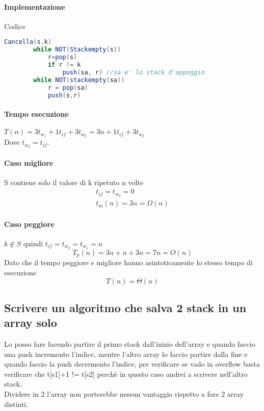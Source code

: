 \paragraph*{Implementazione} Codice
\begin{lstlisting}[language=Java]
    Cancella(s,k)
        while NOT(Stackempty(s))
            r=pop(s)
            if r != k
                push(sa, r) //sa e' lo stack d'appoggio
        while NOT(stackempty(sa))
            r = pop(sa)
            push(s,r)
\end{lstlisting}
\paragraph*{Tempo esecuzione} $T(n)=3t_{w_1}+1t_{if}+3t_{w_2} = 3n + 1t_{if}+3t_{w_2}$\\
Dove $t_{w_2}=t_{if}$.
\paragraph*{Caso migliore} S contiene solo il valore di k ripetuto n volte
\begin{align*}
    t_{if} = t_{w_2} = 0\\
    t_m(n)=3n = \Omega(n)
\end{align*}
\paragraph*{Caso peggiore} $k \notin S$ quindi $t_{if} = t_{w_2} = t_{w_1} = n$\\
\begin{equation*}
    T_p(n)=3n+n+3n=7n=O(n)
\end{equation*}
Dato che il tempo peggiore e migliore hanno asintoticamente lo stesso tempo di esecuzione
\begin{equation*}
    T(n)=\Theta(n)
\end{equation*}
\subsection{Scrivere un algoritmo che salva 2 stack in un array solo}
Lo posso fare facendo partire il primo stack dall'inizio dell'array e quando faccio una
push incremento l'indice, mentre l'altro array lo faccio partire dalla fine e quando faccio la push
decremento l'indice, per verificare se vado in overflow basta verificare che t[s1]+1 != t[s2]
perchè in questo caso andrei a scrivere nell'altro stack.\\
Dividere in 2 l'array non porterebbe nessun vantaggio rispetto a fare 2 array distinti.
